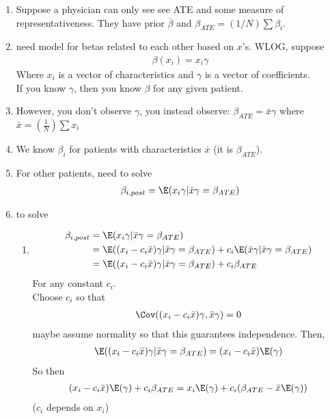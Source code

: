 \begin{enumerate}

	\item  Suppose a physician can only see see ATE and some measure of representativeness. They have prior
		$\bar{\beta}$ and  $\beta_{ATE} = (1/N) \sum \beta_{i}$.

	\item need model for betas related to each other based on $x$'s.
		WLOG, suppose
		\begin{align*}
			\beta(x_i) = x_i \gamma
		\end{align*} 
		Where $x_i$ is a vector of characteristics and $\gamma$ is a vector of coefficients. \\
		If you know $\gamma$, then you know $\beta$ for any given patient.
	\item However, you don't observe $\gamma$, you instead observe:
		$\beta_{ATE} = \bar x \gamma$ where $\bar x = (\frac{1}{N}) \sum x_i$
	\item We know $\beta_i$ for patients with characteristics $\bar x$ (it is $\beta_{ATE}$).
	\item For other patients, need to solve
		\begin{align*}
			\beta_{i,post} = \E(x_i \gamma | \bar x \gamma = \beta_{ATE})
		\end{align*} 

	\item to solve
		\begin{enumerate}
			\item
				\begin{align*}
					\beta_{i,post} & = \E (x_i \gamma | \bar x \gamma = \beta_{ATE})                                                                        \\
								   & = \E((x_i - c_i \bar{x}) \gamma | \bar{x} \gamma = \beta_{ATE}) + c_i \E(\bar{x} \gamma | \bar{x} \gamma = \beta_{ATE}) \\
								   & = \E((x_{i} - c_i \bar{x}) \gamma | \bar{x} \gamma = \beta_{ATE}) + c_i \beta_{ATE}                                       \\
				\end{align*}
				For any constant $c_i$. \\
				Choose $c_i$ so that 
				\begin{align*}
					\Cov((x_{i} - c_i \bar{x})\gamma, \bar{x} \gamma) = 0
				\end{align*} 
				maybe assume normality so that this guarantees independence.
				Then,
				\begin{align*}
					\E((x_i - c_i \bar{x}) \gamma | \bar{x} \gamma = \beta_{ATE}) = (x_{i} - c_i \bar{x}) \E(\gamma)
				\end{align*}
				So then
				\begin{align*}
					(x_i - c_i \bar{x}) \E(\gamma) + c_i \beta_{ATE} = x_i \E(\gamma) + c_i (\beta_{ATE} - \bar{x} \E(\gamma))
				\end{align*} 
				($c_i$ depends on $x_i$)


\end{enumerate}
\end{enumerate}
